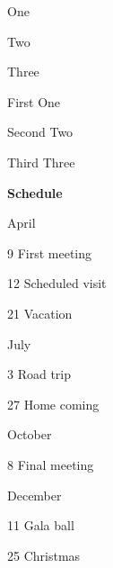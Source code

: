 \documentclass[a4paper, 11pt]{article}
\begin{document}
\begin{example}{}
    \begin{PLTBoxRaster}[handwritten, palette = toasted-peach]
        \item One
        \item Two
        \item Three
    \end{PLTBoxRaster}

    \begin{PLTBoxRaster}[handwritten, palette = sting-has-sprung]
        \item [First] One
        \item [Second] Two
        \item [Third] Three
    \end{PLTBoxRaster}
\end{example}

\noindent\textbf{Schedule}

\begin{example}{}
    \begin{PLTBoxRaster}[month schedule, columns = 4]
        \item [April]
        \begin{PLTBoxRaster}
            \item [9] First meeting
            \item [12] Scheduled visit
            \item [21] Vacation
        \end{PLTBoxRaster}
        \item [July]
        \begin{PLTBoxRaster}
            \item [3] Road trip
            \item [27] Home coming
        \end{PLTBoxRaster}
        \item [October]
        \begin{PLTBoxRaster}
            \item [8] Final meeting
        \end{PLTBoxRaster}
        \item [December]
        \begin{PLTBoxRaster}[day schedule, columns = 1]
            \item [11] Gala ball
            \item [25] Christmas
        \end{PLTBoxRaster}
    \end{PLTBoxRaster}
\end{example}
\end{document}

